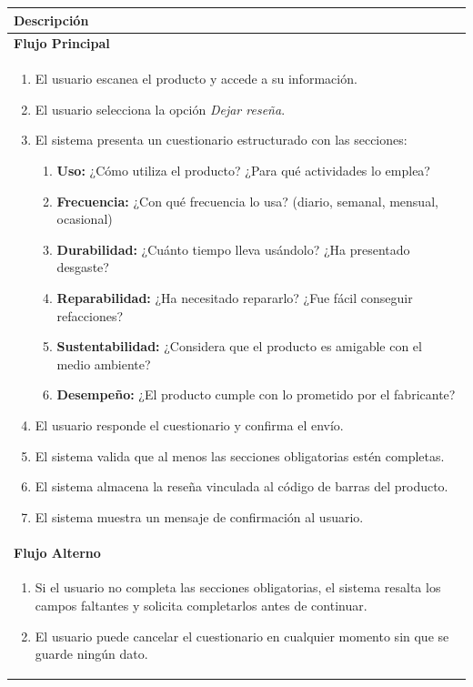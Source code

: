 \begin{table}[H]
\centering
\begin{tabular}{p{15.5cm}}\toprule \textbf{Descripción} \\
\midrule
\textbf{Flujo Principal} \\[2pt]
  \begin{enumerate}
    \item El usuario escanea el producto y accede a su información.
    \item El usuario selecciona la opción \textit{Dejar reseña}.
    \item El sistema presenta un cuestionario estructurado con las
    secciones:
    \begin{enumerate}
        \item \textbf{Uso:} ¿Cómo utiliza el producto? ¿Para qué actividades lo
        emplea?
        \item \textbf{Frecuencia:} ¿Con qué frecuencia lo usa? (diario, semanal,
        mensual, ocasional)
        \item \textbf{Durabilidad:} ¿Cuánto tiempo lleva usándolo? ¿Ha
        presentado desgaste?
        \item \textbf{Reparabilidad:} ¿Ha necesitado repararlo? ¿Fue fácil
        conseguir refacciones?
        \item \textbf{Sustentabilidad:} ¿Considera que el producto es amigable
        con el medio ambiente?
        \item \textbf{Desempeño:} ¿El producto cumple con lo prometido por el
        fabricante?
    \end{enumerate}
    \item El usuario responde el cuestionario y confirma el envío.
    \item El sistema valida que al menos las secciones obligatorias estén
    completas.
    \item El sistema almacena la reseña vinculada al código de barras del
    producto.
    \item El sistema muestra un mensaje de confirmación al usuario.
  \end{enumerate}\\
\midrule
\textbf{Flujo Alterno} \\[2pt]
  \begin{enumerate}
    \item[5a.] Si el usuario no completa las secciones obligatorias, el sistema
    resalta los campos faltantes y solicita completarlos antes de continuar.
    \item[4a.] El usuario puede cancelar el cuestionario en cualquier momento
    sin que se guarde ningún dato.
  \end{enumerate}

\\
\bottomrule
\end{tabular}
\end{table}